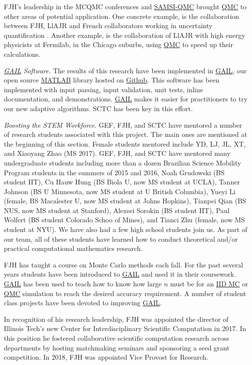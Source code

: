 \documentclass[11pt]{NSFamsart}
\newcommand{\GAIL}{\hyperlink{GAILlink}{GAIL}\xspace}
\newcommand{\QMC}{\hyperlink{QMClink}{QMC}\xspace}
\newcommand{\IIDMC}{\hyperlink{IIDMClink}{IID MC}\xspace}
\newcommand{\SAMSIQMC}{\hyperlink{SAMSIlink}{SAMSI-QMC}\xspace}
\newcommand{\MATLAB}{\hyperlink{MATLABlink}{MATLAB}\xspace}
\newcommand{\Rlang}{\hyperlink{Rlink}{R}\xspace}
\begin{document}
	
FJH's leadership in the MCQMC conferences  and \SAMSIQMC brought \QMC to other areas of potential application.  One concrete example, is the 
	collaboration between FJH, LlAJR and French collaborators working in uncertainty quantification \cite{GilEtal16a, GilJim16b}.  Another example, is the collaboration of LlAJR with
	high energy physicists at Fermilab, in the Chicago suburbs, using \QMC to speed 
	up their calculations.
	
\emph{\GAIL Software.} The results of this research have been implemented in 
\GAIL, our open source \MATLAB library hosted on
\href{http://gailgithub.github.io/GAIL_Dev/} {Github}. This software 
has been implemented with input parsing, input validation, unit tests, inline documentation, and 
demonstrations.  \GAIL makes it easier for practitioners to try our new adaptive algorithms.  SCTC has been key in this effort.  

\emph{Boosting the STEM Workforce.} GEF, FJH, and SCTC have mentored a number of 
research students associated with this project.  The main ones are mentioned at the beginning of 
this section.  Female students mentored include YD, LJ, JL, XT, and Xiaoyang Zhao (MS 2017).   GEF, FJH,  and SCTC have mentored many undergraduate students including more than a dozen 
Brazilian Science Mobility Program students in the summers of 2015 and 2016, Noah Grudowski (BS student IIT), Cu Hauw Hung (BS Biola U, now MS student at UCLA), Tanner Johnson (BS U Minnesota, now MS student at U British Columbia), Yueyi Li (female, BS Macalester U, now MS student at Johns Hopkins), Tianpei Qian (BS NUS, now MS student at Stanford), Alexsei Sorokin (BS student IIT), Paul Wolfert (BS student Colorado Schoo of Mines), and 
Tianci Zhu (female, now MS student at NYU).  We have also had a few high school students join us. As part of our team, all of
these students have learned how to conduct theoretical and/or practical computational mathematics research.

FJH has taught a course on Monte Carlo methods each fall.  For the past several years students 
have been introduced to \GAIL and used it in their coursework.  \GAIL has been used to teach how 
to know how large $n$ must be for an \IIDMC or \QMC simulation to reach the desired accuracy 
requirement.  A number of student class projects have been devoted to improving \GAIL.

In recognition of his research leadership, FJH was appointed the director of Illinois Tech's new Center for Interdisciplinary 
Scientific Computation in 2017.  In this position he fostered collaborative scientific computation 
research across departments by hosting matchmaking seminars and sponsoring a seed grant 
competition. In 2018, FJH was appointed Vice Provost for Research.
\end{document}
